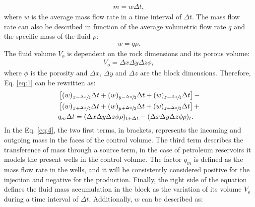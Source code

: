 	\begin{align}
	\label{eq:2}
	m = w \Delta t ,
	\end{align}
where $w$ is the average mass flow rate in a time interval of $\Delta t$. The mass flow rate can also be described in function of the average volumetric flow rate $q$ and the specific mass of the fluid $\rho$:
	\begin{align}
	\label{eq:3}
	w = q \rho.
	\end{align}
The fluid volume $V_o$ is dependent on the rock dimensions and its porous volume:
	\begin{align}
	\label{eq:r1}
	V_o = \Delta x \Delta y \Delta z \phi,
	\end{align}
where $\phi$ is the porosity and $\Delta x$, $\Delta y$ and $\Delta z$ are the block dimensions. Therefore, Eq. \ref{eq:1} can be rewritten as:
	\begin{align}
	\label{eq:4}
	\nonumber & \left[ (w)_{x-\sfrac{\Delta x}{2}}\Delta t+ (w)_{y-\sfrac{\Delta y}{2}}\Delta t + (w)_{z-\sfrac{\Delta z}{2}}\Delta t \right] - \\
	\nonumber & \left[ (w)_{x+\sfrac{\Delta x}{2}}\Delta t+ (w)_{y+\sfrac{\Delta y}{2}}\Delta t + (w)_{z+\sfrac{\Delta z}{2}}\Delta t \right] + \\
	&  q_m \Delta t = (\Delta x \Delta y \Delta z \phi \rho)_{t+\Delta t} - (\Delta x \Delta y \Delta z \phi \rho)_{t} .
	\end{align}
In the Eq. \ref{eq:4}, the two first terms, in brackets, represents the incoming and outgoing mass in the faces of the control volume. The third term describes the transference of mass through a source term, in the case of petroleum reservoirs it models the present wells in the control volume. The factor $q_m$ is defined as the mass flow rate in the wells, and it will be consistently considered positive for the injection and negative for the production. Finally, the right side of the equation defines the fluid mass accumulation in the block as the variation of its volume $V_o$ during a time interval of $\Delta t$. Additionally, $w$ can be described as:
